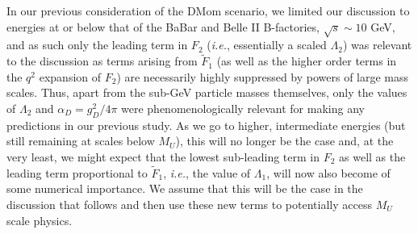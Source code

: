 \documentclass[14pt]{article}
\def\ie{{\it i.e.}}
\begin{document}
In our previous consideration of the DMom scenario, we limited our discussion to energies at or below that of the BaBar and Belle II B-factories, $\sqrt s \sim 10$ GeV, and as such only the 
leading term in $F_2$ (\ie, essentially a scaled $\Lambda_2$) was relevant to the discussion as terms arising from $\tilde F_1$ (as well as the higher order terms in the $q^2$ expansion of $F_2$) 
are necessarily highly suppressed by powers of large mass scales. Thus, apart from the sub-GeV particle masses themselves, only the values of $\Lambda_2$ and $\alpha_D=g_D^2/4\pi$ 
were phenomenologically relevant for making any predictions in our previous study. As we go to higher, intermediate energies (but still remaining at scales below $M_U$), this will no longer 
be the case and, at the very least, we might expect that the lowest sub-leading term in $F_2$ as well as the leading term proportional to $\tilde F_1$, \ie, the value of $\Lambda_1$, will now 
also become of some numerical importance.  We assume that this will be the case in the discussion that follows and then use these new terms to potentially access $M_U$ scale physics.
\end{document}
